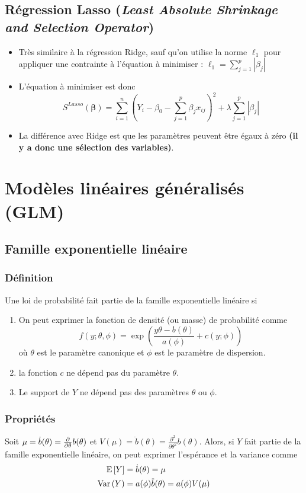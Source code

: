 \documentclass[10pt, french]{article}
\begin{document}
\begin{multicols*}{3}
\subsection*{Régression Lasso (\emph{Least Absolute Shrinkage and Selection Operator})}
\begin{itemize}
\item Très similaire à la régression Ridge, sauf qu'on utilise la norme $\ell_1$ pour appliquer une contrainte à l'équation à minimiser : 
$\ell_1 = \sum_{j=1}^{p} | \beta_j | $

\item L'équation à minimiser est donc
\[S^{Lasso}(\bm{\beta})  = \sum_{i=1}^{n} \left( Y_i - \beta_0 - \sum_{j=1}^{p} \beta_j x_{ij} \right)^2 + \lambda \sum_{j=1}^{p} | \beta_j | \]

\item La différence avec Ridge est que les paramètres peuvent être égaux à zéro \textbf{(il y a donc une sélection des variables)}.
\end{itemize}



\section{Modèles linéaires généralisés (GLM)}
\subsection*{Famille exponentielle linéaire}
\subsubsection*{Définition}
Une loi de probabilité fait partie de la famille exponentielle linéaire si
\begin{enumerate}[label=\faAngleRight]
\item On peut exprimer la fonction de densité (ou masse) de probabilité comme
\[f(y ; \theta, \phi) =   \exp \left( \frac{y \theta - b(\theta)}{a(\phi)} + c(y ; \phi)    \right)  \] 
où $\theta$ est le paramètre canonique et $\phi$ est le paramètre de dispersion.

\item la fonction $c$ ne dépend pas du paramètre $\theta$.
\item Le support de $Y$ ne dépend pas des paramètres $\theta$ ou $\phi$.
\end{enumerate}

\subsubsection*{Propriétés}
Soit $\mu = \dot{b}(\theta) = \frac{\partial}{\partial \theta} b(\theta)$ et $V(\mu) = \ddot{b}(\theta) = \frac{\partial^2}{\partial \theta^2} b(\theta)$. Alors, si $Y$ fait partie de la famille exponentielle linéaire, on peut exprimer l'espérance et la variance comme
\begin{align*}
\mathrm{E} \left[ Y \right]	& = \dot{b}(\theta) = \mu \\
\mathrm{Var} \left( Y \right)	& = a(\phi) \ddot{b}(\theta) = a(\phi) V(\mu) \\
\end{align*}


\end{multicols*}
\end{document}

